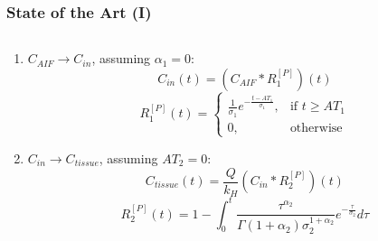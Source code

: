%

\begin{frame}
  \frametitle{State of the Art (I)}
  \cite{Dt_patent_wo2005104936a12005}
    \begin{columns}
    \begin{column}{0.45\textwidth}                 %
    {\small
    \begin{enumerate}
        \item $C_{AIF} \rightarrow C_{in}$, assuming $\alpha_1 = 0$:
        \begin{equation}
            C_{in}(t) = \left( C_{AIF} * R_{1}^{[P]} \right)(t)
        \end{equation}
        \begin{equation}
            R_{1}^{[P]}(t) = \left\{
            \begin{array}{ll}
            \frac{1}{\sigma_1} e^{-\frac{t - AT_1}{\sigma_1}}, & \text{if } t \geq AT_1 \\
            0, & \text{otherwise}
            \end{array}\right.
        \end{equation}
        \item $C_{in} \rightarrow C_{tissue}$, assuming $AT_2 = 0$:
        \begin{equation}
        C_{tissue}(t) = \frac{Q}{k_H}\left( C_{in} * R_{2}^{[P]} \right)(t)
        \end{equation}
        \begin{equation}
            R_{2}^{[P]}(t) = 1 - \int_0^t \frac{\tau^{\alpha_2}}{\Gamma(1 + \alpha_2) \sigma_2^{1+\alpha_2}} e^{-\frac{\tau}{\sigma_2}} d\tau 
        \end{equation}
    \end{enumerate}
    }
    \end{column}
    
    \hspace*{4em}                                                          %
    

\end{columns}
\end{frame}
